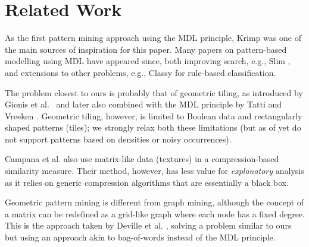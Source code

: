\documentclass{llncs}
\begin{document}
\section{Related Work}

As the first pattern mining approach using the MDL principle, Krimp \cite{krimp} was one of the main sources of inspiration for this paper. Many papers on pattern-based modelling using MDL have appeared since, both improving search, e.g., Slim \cite{slim}, and extensions to other problems, e.g., Classy \cite{classy} for rule-based classification.

The problem closest to ours is probably that of geometric tiling, as introduced by Gionis et al.\ \cite{gionis2004tiles} and later also combined with the MDL principle by Tatti and Vreeken \cite{tatti2012stijl}. Geometric tiling, however, is limited to Boolean data and rectangularly shaped patterns (tiles); we strongly relax both these limitations (but as of yet do not support patterns based on densities or noisy occurrences).

Campana et al. \cite{campana2010compression} also use matrix-like data (textures) in a compression-based similarity measure. Their method, however, has less value for \emph{explanatory} analysis as it relies on generic compression algorithms that are essentially a black box.

Geometric pattern mining is different from graph mining, although the concept of a matrix can be redefined as a grid-like graph where each node has a fixed degree. This is the approach taken by Deville et al. \cite{deville2016grima}, solving a problem similar to ours but using an approach akin to bag-of-words instead of the MDL principle.
\end{document}
